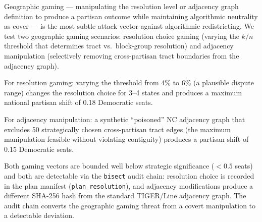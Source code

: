 Geographic gaming --- manipulating the resolution level or adjacency graph definition
to produce a partisan outcome while maintaining algorithmic neutrality as cover ---
is the most subtle attack vector against algorithmic redistricting.
We test two geographic gaming scenarios: resolution choice gaming (varying the
$k/n$ threshold that determines tract vs.\ block-group resolution) and adjacency
manipulation (selectively removing cross-partisan tract boundaries from the
adjacency graph).

For resolution gaming: varying the threshold from 4\% to 6\% (a plausible
dispute range) changes the resolution choice for 3--4 states and produces a
maximum national partisan shift of 0.18 Democratic seats.

For adjacency manipulation: a synthetic ``poisoned'' NC adjacency graph that
excludes 50 strategically chosen cross-partisan tract edges (the maximum
manipulation feasible without violating contiguity) produces a partisan shift
of 0.15 Democratic seats.

Both gaming vectors are bounded well below strategic significance ($< 0.5$ seats)
and both are detectable via the \texttt{bisect} audit chain:
resolution choice is recorded in the plan manifest (\texttt{plan\_resolution}),
and adjacency modifications produce a different SHA-256 hash from the
standard TIGER/Line adjacency graph.
The audit chain converts the geographic gaming threat from a covert manipulation
to a detectable deviation.
